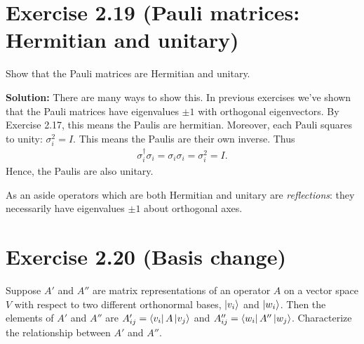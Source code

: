 \documentclass{book}
\begin{document}
\section*{Exercise 2.19 (Pauli matrices: Hermitian and unitary)}
    Show that the Pauli matrices are Hermitian and unitary.
    
    \textbf{Solution:} There are many ways to show this. In previous exercises we've shown that the Pauli matrices have eigenvalues $\pm 1$ with orthogonal eigenvectors. By Exercise 2.17, this means the Paulis are hermitian. Moreover, each Pauli squares to unity: $\sigma_i^2 = I$. This means the Paulis are their own inverse. Thus
    \begin{align}
        \sigma_i^\dagger \sigma_i = \sigma_i \sigma_i = \sigma_i^2 = I.
    \end{align}
    Hence, the Paulis are also unitary.
    
    As an aside operators which are both Hermitian and unitary are \emph{reflections}: they necessarily have eigenvalues $\pm 1$ about orthogonal axes.
    
\section*{Exercise 2.20 (Basis change)}
    Suppose $A'$ and $A''$ are matrix representations of an operator $A$ on a vector space $V$ with respect to two different orthonormal bases, $\ket{v_i}$ and $\ket{w_i}$. Then the elements of $A'$ and $A''$ are $A'_{ij} = \bra{v_i}A\ket{v_j}$ and $A''_{ij} = \bra{w_i}A''\ket{w_j}$. Characterize the relationship between $A'$ and $A''$.
    
\end{document}
